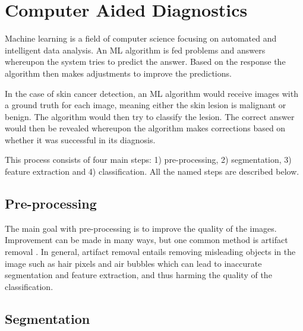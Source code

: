 \documentclass{kththesis}
\begin{document}

\section{Computer Aided Diagnostics}


Machine learning is a field of computer science focusing on automated and intelligent data analysis. An ML algorithm is fed problems and answers whereupon the system tries to predict the answer. Based on the response the algorithm then makes adjustments to improve the predictions. \parencite{das2021machine}

In the case of skin cancer detection, an ML algorithm would receive images with a ground truth for each image, meaning either the skin lesion is malignant or benign. The algorithm would then try to classify the lesion. The correct answer would then be revealed whereupon the algorithm makes corrections based on whether it was successful in its diagnosis.

This process consists of four main steps: 1) pre-processing, 2) segmentation, 3) feature extraction and 4) classification. All the named steps are described below.

\subsection{Pre-processing}

The main goal with pre-processing is to improve the quality of the images. Improvement can be made in many ways, but one common method is artifact removal \parencite{8377976}.
In general, artifact removal entails removing misleading objects in the image such as hair pixels and air bubbles which can lead to inaccurate segmentation and feature extraction, and thus harming the quality of the classification. \parencite{jaworek2016automatic}

\subsection{Segmentation}
\end{document}
